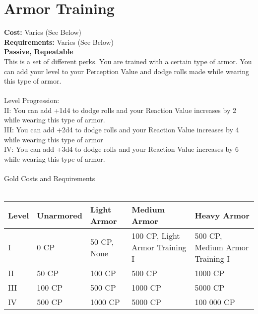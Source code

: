 \section{Armor Training}
\textbf{Cost:} Varies (See Below)\\
\textbf{Requirements:} Varies (See Below)\\
\textbf{Passive, Repeatable}\\
This is a set of different perks. You are trained with a certain type of armor. You can add your level to your Perception Value and dodge rolls made while wearing this type of armor.\\
\\
Level Progression:\\
II: You can add +1d4 to dodge rolls and your Reaction Value increases by 2 while wearing this type of armor.\\
III: You can add +2d4 to dodge rolls and your Reaction Value increases by 4 while wearing this type of armor\\
IV: You can add +3d4 to dodge rolls and your Reaction Value increases by 6 while wearing this type of armor.\\
\\
Gold Costs and Requirements\\
\\
\begin{tabular}{l | p{2cm} | p{2.4cm} | p{2.6cm} | p{2.6cm}}
	Level & Unarmored & Light Armor & Medium Armor & Heavy Armor\\ \hline
	I & 0 CP & 50 CP, None & 100 CP, Light Armor Training I & 500 CP, Medium Armor Training I\\
	II & 50 CP& 100 CP & 500 CP & 1000 CP\\
	III & 100 CP& 500 CP & 1000 CP & 5000 CP\\
	IV & 500 CP& 1000 CP & 5000 CP & 100 000 CP\\
\end{tabular}